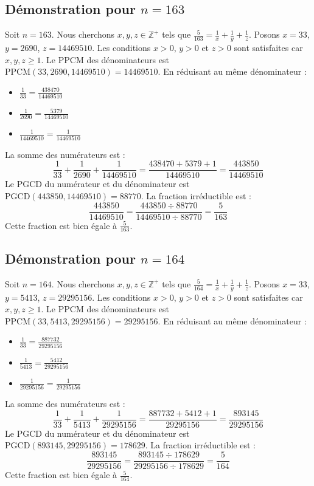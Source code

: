 \documentclass[11pt,a4paper]{article}
\begin{document}
\subsection{Démonstration pour $n = 163$}
Soit $n = 163$. Nous cherchons $x, y, z \in \mathbb{Z}^{+}$ tels que $\frac{5}{163} = \frac{1}{x} + \frac{1}{y} + \frac{1}{z}$.
Posons $x = 33$, $y = 2690$, $z = 14469510$.
Les conditions $x > 0$, $y > 0$ et $z > 0$ sont satisfaites car $x, y, z \geq 1$.
Le PPCM des dénominateurs est $\text{PPCM}(33, 2690, 14469510) = 14469510$.
En réduisant au même dénominateur :
\begin{itemize}
    \item $\frac{1}{33} = \frac{438470}{14469510}$
    \item $\frac{1}{2690} = \frac{5379}{14469510}$
    \item $\frac{1}{14469510} = \frac{1}{14469510}$
\end{itemize}
La somme des numérateurs est :
$$ \frac{1}{33} + \frac{1}{2690} + \frac{1}{14469510} = \frac{438470 + 5379 + 1}{14469510} = \frac{443850}{14469510} $$
Le PGCD du numérateur et du dénominateur est $\text{PGCD}(443850, 14469510) = 88770$.
La fraction irréductible est :
$$ \frac{443850}{14469510} = \frac{443850 \div 88770}{14469510 \div 88770} = \frac{5}{163} $$
Cette fraction est bien égale à $\frac{5}{163}$.

\subsection{Démonstration pour $n = 164$}
Soit $n = 164$. Nous cherchons $x, y, z \in \mathbb{Z}^{+}$ tels que $\frac{5}{164} = \frac{1}{x} + \frac{1}{y} + \frac{1}{z}$.
Posons $x = 33$, $y = 5413$, $z = 29295156$.
Les conditions $x > 0$, $y > 0$ et $z > 0$ sont satisfaites car $x, y, z \geq 1$.
Le PPCM des dénominateurs est $\text{PPCM}(33, 5413, 29295156) = 29295156$.
En réduisant au même dénominateur :
\begin{itemize}
    \item $\frac{1}{33} = \frac{887732}{29295156}$
    \item $\frac{1}{5413} = \frac{5412}{29295156}$
    \item $\frac{1}{29295156} = \frac{1}{29295156}$
\end{itemize}
La somme des numérateurs est :
$$ \frac{1}{33} + \frac{1}{5413} + \frac{1}{29295156} = \frac{887732 + 5412 + 1}{29295156} = \frac{893145}{29295156} $$
Le PGCD du numérateur et du dénominateur est $\text{PGCD}(893145, 29295156) = 178629$.
La fraction irréductible est :
$$ \frac{893145}{29295156} = \frac{893145 \div 178629}{29295156 \div 178629} = \frac{5}{164} $$
Cette fraction est bien égale à $\frac{5}{164}$.
\end{document}
